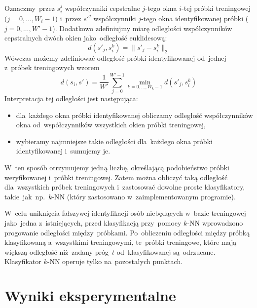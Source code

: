 \documentclass[11pt,a4paper]{article}
\begin{document}
Oznaczmy~przez $s_i^j$ współczynniki cepstralne $j$-tego okna $i$-tej próbki treningowej ($j = 0, \dots, W_i - 1$) i~przez $s'^j$ współczynniki $j$-tego okna identyfikowanej próbki ($j = 0, \dots, W' - 1$).
Dodatkowo zdefiniujmy miarę odległości współczynników cepstralnych dwóch okien jako~odległość euklidesową:
$$ d(s'_j, s_i^k) = \lVert s'_j - s_i^k \rVert_2 $$
Wówczas możemy zdefiniować odległość próbki identyfikowanej od~jednej z~próbek treningowych wzorem
$$ d(s_i, s') = \frac{1}{W'} \sum_{j=0}^{W' - 1} \min_{k=0, \dots, W_k - 1} d(s'_j, s_i^k) $$
Interpretacja tej odległości jest następująca:
\begin{itemize}
    \item dla~każdego okna próbki identyfikowanej obliczamy odległość współczynników okna od~współczynników wszystkich okien próbki treningowej,
    \item wybieramy najmniejsze takie odległości dla~każdego okna próbki identyfikowanej i~sumujemy je.
\end{itemize}
W~ten sposób otrzymujemy jedną liczbę, określającą podobieństwo próbki weryfikowanej i~próbki treningowej.
Zatem można obliczyć taką odległość dla~wszystkich próbek treningowych i~zastosować dowolne proste klasyfikatory, takie~jak~np.~$k$-NN (który zastosowano w~zaimplementowanym programie).

W~celu uniknięcia fałszywej identyfikacji osób niebędących w~bazie treningowej jako~jedna z~istniejących, przed klasyfikacją przy~pomocy $k$-NN wprowadzono progowanie odległości między~próbkami.
Po~obliczeniu odległości między próbką klasyfikowaną a~wszystkimi treningowymi, te~próbki treningowe, które mają większą odległość niż~zadany próg~$t$ od~klasyfikowanej są~odrzucane.
Klasyfikator $k$-NN operuje tylko na~pozostałych punktach.

\section{Wyniki eksperymentalne}
\label{sec:results}
\end{document}
